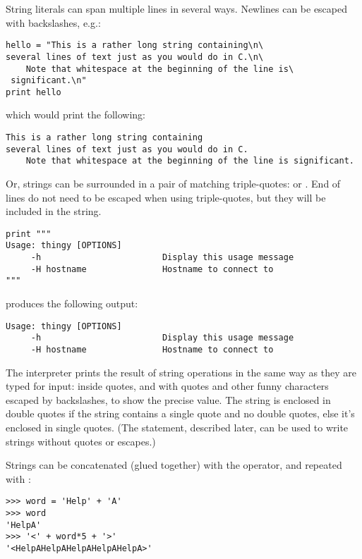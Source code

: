 \documentclass{manual}
\begin{document}
String literals can span multiple lines in several ways.  Newlines can
be escaped with backslashes, e.g.:

\begin{verbatim}
hello = "This is a rather long string containing\n\
several lines of text just as you would do in C.\n\
    Note that whitespace at the beginning of the line is\
 significant.\n"
print hello
\end{verbatim}

which would print the following:

\begin{verbatim}
This is a rather long string containing
several lines of text just as you would do in C.
    Note that whitespace at the beginning of the line is significant.
\end{verbatim}

Or, strings can be surrounded in a pair of matching triple-quotes:
\code{"""} or .  End of lines do not need to be escaped
when using triple-quotes, but they will be included in the string.

\begin{verbatim}
print """
Usage: thingy [OPTIONS] 
     -h                        Display this usage message
     -H hostname               Hostname to connect to
"""
\end{verbatim}

produces the following output:

\begin{verbatim}
Usage: thingy [OPTIONS] 
     -h                        Display this usage message
     -H hostname               Hostname to connect to
\end{verbatim}

The interpreter prints the result of string operations in the same way
as they are typed for input: inside quotes, and with quotes and other
funny characters escaped by backslashes, to show the precise
value.  The string is enclosed in double quotes if the string contains
a single quote and no double quotes, else it's enclosed in single
quotes.  (The \keyword{print} statement, described later, can be used
to write strings without quotes or escapes.)

Strings can be concatenated (glued together) with the \code{+}
operator, and repeated with \code{*}:

\begin{verbatim}
>>> word = 'Help' + 'A'
>>> word
'HelpA'
>>> '<' + word*5 + '>'
'<HelpAHelpAHelpAHelpAHelpA>'
\end{verbatim}
\end{document}
